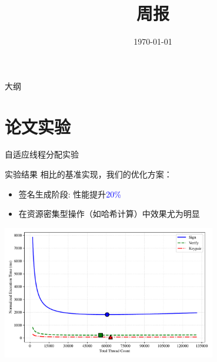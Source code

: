\documentclass{beamer}
\title{\LARGE{周报}}
\subtitle{}
\author{}
\date{\today}
\begin{document}
\begin{frame}
  \titlepage
\end{frame}

\begin{frame}{大纲}
  \tableofcontents
\end{frame}

\section{论文实验}
\begin{frame}{自适应线程分配实验}
  \begin{block}{实验结果}
    相比\cite{Wang2025}的基准实现，我们的优化方案：
    \begin{itemize}
      \item 签名生成阶段: 性能提升\textcolor{blue}{20\%}
      \item 在资源密集型操作（如哈希计算）中效果尤为明显
    \end{itemize}
  \end{block}

  \begin{center}
    \includegraphics[width=0.7\textwidth]{./fig/thread_efficiency.pdf}
  \end{center}
\end{frame}

\end{document}
